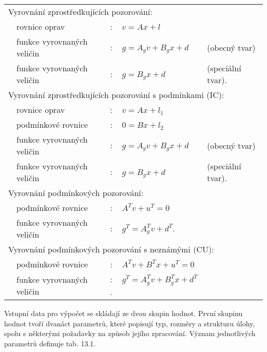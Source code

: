 \begin{longtable}[l]{llll}
  \multicolumn{4}{l}{Vyrovnání zprostředkujících pozorování:}\\
  &rovnice oprav & : ~ $v = Ax + l$ \\
  &funkce vyrovnaných veličin & : ~ $g = A_gv + B_gx + d $ & (obecný tvar)\\
  &funkce vyrovnaných veličin & : ~ $g = B_gx + d $ & (speciální tvar).\\
  \multicolumn{4}{l}{Vyrovnání zprostředkujících pozorování
    s podmínkami (IC):}\\
  &rovnice oprav & : ~ $v = Ax + l_1$ \\
  &podmínkové rovnice & : ~ $0 = Bx + l_2$ \\
  &funkce vyrovnaných veličin & : ~ $g = A_gv + B_gx + d $ & (obecný tvar)\\
  &funkce vyrovnaných veličin & : ~ $g = B_gx + d $ & (speciální tvar).\\
  \multicolumn{4}{l}{Vyrovnání podmínkových pozorování:}\\
  &podmínkové rovnice & : ~ $A^Tv + u^T = 0$\\
  &funkce vyrovnaných veličin & : ~ $g^T = A_g^Tv  +d^T $. \\
  \multicolumn{4}{l}{Vyrovnání podmínkových pozorování
    s neznámými (CU):}\\
  &podmínkové rovnice & : ~ $A^Tv + B^Tx + u^T = 0$\\
  &funkce vyrovnaných veličin & : ~ $g^T = A_g^Tv + B^T_gx + d^T $ . \\
\end{longtable}

Vstupní data pro výpočet se skládají ze dvou skupin hodnot.
První skupinu hodnot tvoří dvanáct parametrů, které popisují
typ, rozměry a strukturu úlohy, spolu s některými požadavky na
způsob jejího zpracování. Význam jednotlivých parametrů
definuje tab. 13.1.  


